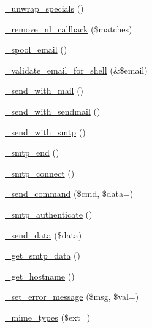 \begin{DoxyCompactItemize}
\item 
\mbox{\hyperlink{class_c_i___email_a7d890ac5ad876a27a914b40600ae4e64}{\+\_\+unwrap\+\_\+specials}} ()
\item 
\mbox{\hyperlink{class_c_i___email_a110b529d3b6362464816bf08d2342f2d}{\+\_\+remove\+\_\+nl\+\_\+callback}} (\$matches)
\item 
\mbox{\hyperlink{class_c_i___email_a841bfd08e15b57da914f94c958f9c32f}{\+\_\+spool\+\_\+email}} ()
\item 
\mbox{\hyperlink{class_c_i___email_aefdcdf1521a41b9914518e5e686ddbde}{\+\_\+validate\+\_\+email\+\_\+for\+\_\+shell}} (\&\$email)
\item 
\mbox{\hyperlink{class_c_i___email_a3a12fbbf7152b394787a462f639b22a3}{\+\_\+send\+\_\+with\+\_\+mail}} ()
\item 
\mbox{\hyperlink{class_c_i___email_a6c1a26204de8d4e238132cea15514d34}{\+\_\+send\+\_\+with\+\_\+sendmail}} ()
\item 
\mbox{\hyperlink{class_c_i___email_a06b13165f9c0875c09775184f1135f43}{\+\_\+send\+\_\+with\+\_\+smtp}} ()
\item 
\mbox{\hyperlink{class_c_i___email_a181a406ba1ed63ac61c3ad325ffbd375}{\+\_\+smtp\+\_\+end}} ()
\item 
\mbox{\hyperlink{class_c_i___email_a4a0be45e5ab10e8a9084f2338fdf4a4f}{\+\_\+smtp\+\_\+connect}} ()
\item 
\mbox{\hyperlink{class_c_i___email_a692744b5787a086f2730277a0d169b75}{\+\_\+send\+\_\+command}} (\$cmd, \$data=\textquotesingle{}\textquotesingle{})
\item 
\mbox{\hyperlink{class_c_i___email_ade900fb86b8b6e5483a9517c400e3e59}{\+\_\+smtp\+\_\+authenticate}} ()
\item 
\mbox{\hyperlink{class_c_i___email_aaae3ab0f49aa24114786cf3fd9800798}{\+\_\+send\+\_\+data}} (\$data)
\item 
\mbox{\hyperlink{class_c_i___email_a0d301ffef6de8400d70f17463324581a}{\+\_\+get\+\_\+smtp\+\_\+data}} ()
\item 
\mbox{\hyperlink{class_c_i___email_aa86dbf32fca65cbf48b61ea6b343506b}{\+\_\+get\+\_\+hostname}} ()
\item 
\mbox{\hyperlink{class_c_i___email_a01ecd03616a09a9c2a4e1ca4617dadee}{\+\_\+set\+\_\+error\+\_\+message}} (\$msg, \$val=\textquotesingle{}\textquotesingle{})
\item 
\mbox{\hyperlink{class_c_i___email_a1e05091d048a1756b0aff6e869016018}{\+\_\+mime\+\_\+types}} (\$ext=\textquotesingle{}\textquotesingle{})
\end{DoxyCompactItemize}
